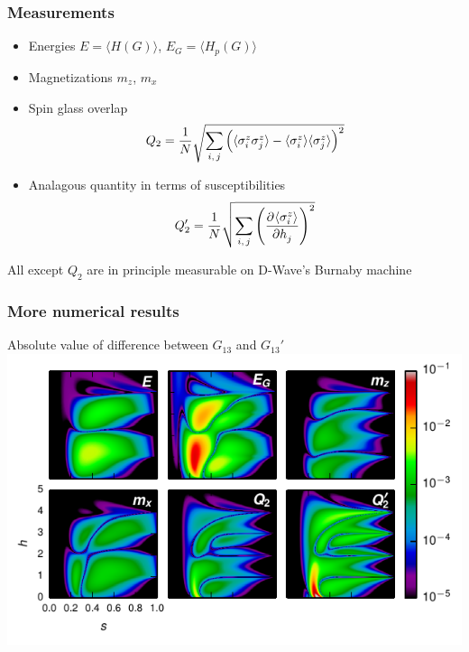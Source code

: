 \documentclass{beamer}
\newcommand{\ev}[1]{\langle #1 \rangle} %
\begin{document}
\appendix
\section{\appendixname}

\begin{frame}
  \frametitle{Measurements}
  \begin{itemize}
    \item Energies $E=\ev{H(G)}$, $E_G=\ev{H_p(G)}$
    \item Magnetizations $m_z$, $m_x$
    \item Spin glass overlap
    \begin{equation*}
      Q_2 = \frac{1}{N} \sqrt{
        \sum_{i,\,j} \del{
          \ev{\sigma^z_i \sigma^z_j} -
          \ev{\sigma^z_i} \ev{\sigma^z_j}
        }^2
      }
    \end{equation*}
    \item Analagous quantity in terms of susceptibilities
    \begin{equation*}
      Q_2' = \frac{1}{N} \sqrt{\sum_{i,\,j} \del{\dpd{\ev{\sigma^z_i}}{h_j}}^2}
    \end{equation*}
  \end{itemize}
  \alert{All except $Q_2$ are in principle measurable on D-Wave's Burnaby machine}
\end{frame}

\begin{frame}
  \frametitle{More numerical results}
  \begin{center}
    Absolute value of difference between $G_{13}$ and $G_{13}'$
    \includegraphics{delta-grid}
  \end{center}
\end{frame}
\end{document}
